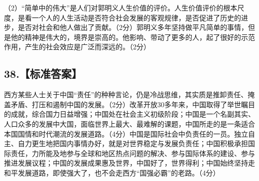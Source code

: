 \documentclass[UTF8,11pt]{ctexart}
\begin{document}
（2）“简单中的伟大”是人们对郭明义人生价值的评价。人生价值评价的根本尺度，是看一个人的人生活动是否符合社会发展的客观规律，是否促进了历史的进步，是否对社会和他人做出了贡献。（2分）郭明义多年坚持做平凡简单的事情，但是他的精神是伟大的，境界是崇高的。他影响、带动了更多的人，起了很好的示范作用，产生的社会效应是广泛而深远的。（2分）


\subsection*{38.【标准答案】}

西方某些人士关于中国“责任”的种种言论，仍是冷战思维，其实质是推卸责任、掩盖矛盾、打压和遏制中国的发展。（2分）改革开放30多年来，中国取得了举世瞩目的成就，综合国力日益增强；中国处在社会主义初级阶段；中国是一个名副其实、人口众多的发展中大国，面临世界上最大、最难解的课题，中国所走的是一条适合本国国情和时代潮流的发展道路。（4分）中国是国际社会中负责任的一员。独立自主、自力更生地把国内事情办好，就是对世界稳定与发展负责任；中国积极承担国际责任，力所能及地参与全球和地区热点问题的解决、参与国际体系的建设、参与推进发展议程；中国的发展成果惠及世界，中国好了，世界得利；中国始终坚持走和平发展道路，即使强大了，也不会走西方“国强必霸”的老路。（4分）
\end{document}
